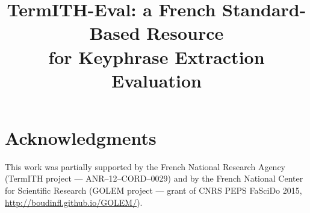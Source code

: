 \documentclass[10pt, a4paper]{article}
\title{TermITH-Eval: a French Standard-Based Resource\\for Keyphrase Extraction Evaluation}
\begin{document}
    \maketitleabstract

    
    
    
    
    

    \section{Acknowledgments}
    This work was partially supported by the French National Research Agency (TermITH project --- ANR--12--CORD--0029) and by the French National Center for Scientific Research (GOLEM project --- grant of CNRS PEPS FaSciDo 2015, \url{http://boudinfl.github.io/GOLEM/}).

    
    
\end{document}

